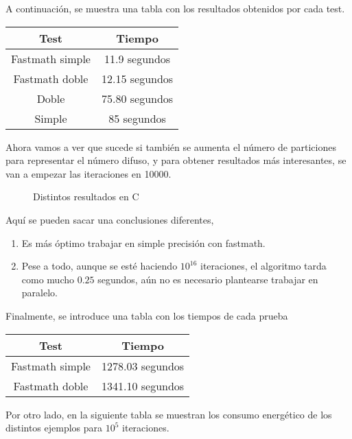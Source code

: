 \begin{ejemplo}
A continuación, se muestra una tabla con los resultados obtenidos por cada test.

\begin{table}[H]
	\centering
	\begin{tabular}{|c|c|}
		\hline
		\textbf{Test}  & \textbf{Tiempo}        \\ \hline
		Fastmath simple & 11.9 segundos \\ 
		Fastmath doble   & 12.15 segundos    \\
		Doble   & 75.80 segundos \\
		Simple     & 85 segundos    \\
		\hline
	\end{tabular}%
\end{table}

Ahora vamos a ver que sucede si también se aumenta el número de particiones para representar el número difuso, y para obtener resultados más interesantes, se van a empezar las iteraciones en 10000.

\begin{figure}[H]
	\centering
	\caption{Distintos resultados en C}
	\label{fig:eulercseq2}
\end{figure}
Aquí se pueden sacar una conclusiones diferentes,
\begin{enumerate}
	\item Es más óptimo trabajar en simple precisión con fastmath.
	
	\item Pese a todo, aunque se esté haciendo $10^{16}$ iteraciones, el algoritmo tarda como mucho $0.25$ segundos, aún no es necesario plantearse trabajar en paralelo.
\end{enumerate}
Finalmente, se introduce una tabla con los tiempos de cada prueba

\begin{table}[H]
	\centering
	\begin{tabular}{|c|c|}
		\hline
		\textbf{Test}  & \textbf{Tiempo}        \\ \hline
		Fastmath simple & 1278.03 segundos \\ 
		Fastmath doble   & 1341.10 segundos  \\ \hline
	\end{tabular}%
\end{table}

Por otro lado, en la siguiente tabla se muestran los consumo energético de los distintos ejemplos para $10^{5}$ iteraciones.


\end{ejemplo}
